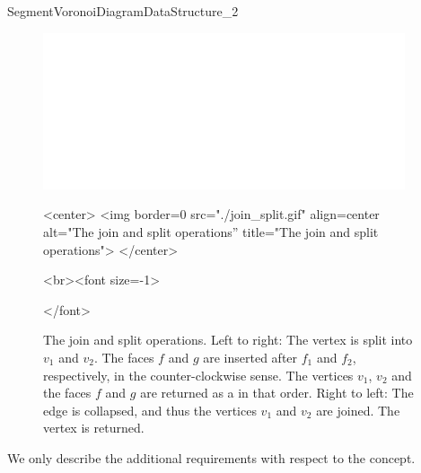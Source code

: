 \begin{ccRefConcept}{SegmentVoronoiDiagramDataStructure_2}
\begin{figure}[htb]\label{fig-svdds-split-join}
\begin{ccTexOnly}
\begin{center}
\includegraphics[width=0.95\textwidth]
{Segment_Voronoi_diagram_2_ref/join_split}
\end{center}
\end{ccTexOnly}
\begin{ccHtmlOnly}
<center>
<img border=0 src="./join_split.gif" align=center
alt="The join and split operations''
title="The join and split operations">
</center>
\end{ccHtmlOnly}
\begin{ccHtmlOnly}
<br><font size=-1>
\end{ccHtmlOnly}
\caption{The join and split operations. Left to right:
The vertex  is split into $v_1$ and $v_2$. The faces $f$ and
$g$ are inserted after $f_1$ and $f_2$, respectively, in the
counter-clockwise sense. The vertices $v_1$, $v_2$ and the faces $f$
and $g$ are returned as a   in that order.
Right to left: The edge  is collapsed, and thus the
vertices $v_1$ and $v_2$ are joined. The vertex  is
returned.}
\begin{ccHtmlOnly}
</font>
\end{ccHtmlOnly}
\end{figure}



We only describe the additional requirements with respect to the
 concept.

\ccRefines
{}

%
\ccGlue
{}


\end{ccRefConcept}

